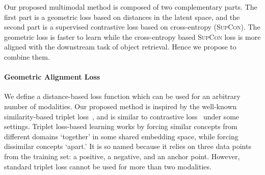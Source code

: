 \documentclass[10pt]{article} %
\newcommand{\supcon}{\textsc{SupCon}}
\begin{document}
Our proposed multimodal method is composed of two complementary parts. The first part is a geometric loss based on distances in the latent space, and the second part is a supervised contrastive loss based on cross-entropy (\supcon{}). The geometric loss is faster to learn while the cross-entropy based \supcon{} loss is more aligned with the downstream task of object retrieval. Hence we propose to combine them. 

\paragraph{Geometric Alignment Loss}
\label{subsec:geom-loss}

We define a distance-based loss function which can be used for an arbitrary number of modalities. Our proposed method is inspired by the well-known similarity-based triplet loss~\citep{Carvalho-cooking-triplet,triplet_loss_2021_CVPR}, and is similar to contrastive loss~\citep{chen2020simple,NEURIPS2020_supervised_contrastive} under some settings.
Triplet loss-based learning works by forcing similar concepts from different domains `together' in some shared embedding space, while forcing dissimilar concepts `apart.' It is so named because it relies on three data points from the training set: a positive, a negative, and an anchor point. 
However, standard triplet loss cannot be used for more than two modalities.
\end{document}
